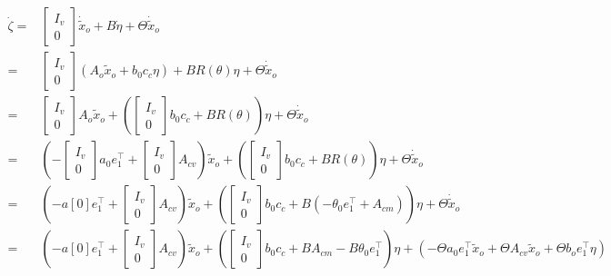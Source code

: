 \documentclass[a4paper,12pt]{article}
\begin{document}
\begin{align*}
    \dot{\zeta} 
       = & \begin{bmatrix}I_{v} \\ 0 \end{bmatrix} \dot{\tilde{x}}_o + B\dot{\eta} + \Theta \dot{\tilde{x}}_o
    \\ = & \begin{bmatrix}I_{v} \\ 0 \end{bmatrix}(A_o \tilde{x}_o + b_0 c_c \eta) + B R(\theta) \eta + \Theta \dot{\tilde{x}}_o
    \\ = & \begin{bmatrix}I_{v} \\ 0 \end{bmatrix}A_o \tilde{x}_o 
    + \left(\begin{bmatrix}I_{v} \\ 0 \end{bmatrix}b_0 c_c  + B R(\theta) \right)\eta 
    + \Theta \dot{\tilde{x}}_o
    \\ = & \left(-\begin{bmatrix}I_{v} \\ 0 \end{bmatrix}a_0e_1^\top + \begin{bmatrix}I_{v} \\ 0 \end{bmatrix}A_{cv} \right)\tilde{x}_o
    + \left(\begin{bmatrix}I_{v} \\ 0 \end{bmatrix}b_0 c_c  + B R(\theta) \right)\eta + \Theta \dot{\tilde{x}}_o
    \\ = & \left( -a[0]e_1^\top + \begin{bmatrix}I_{v} \\ 0 \end{bmatrix}A_{cv} \right)\tilde{x}_o
    + \left(\begin{bmatrix}I_{v} \\ 0 \end{bmatrix}b_0 c_c  
    + B \left(-\theta_0 e_1^\top + A_{cm}\right) \right)\eta 
    + \Theta \dot{\tilde{x}}_o
    \\ = & \left( -a[0]e_1^\top + \begin{bmatrix}I_{v} \\ 0 \end{bmatrix}A_{cv} \right)\tilde{x}_o
    + \left(\begin{bmatrix}I_{v} \\ 0 \end{bmatrix}b_0 c_c  
    + B A_{cm} -B\theta_0 e_1^\top \right)\eta 
    + \left( - \Theta a_0 e_1^\top\tilde{x}_o + \Theta A_{cv}\tilde{x}_o + \Theta b_oe_1^\top\eta\right)
\end{align*}
\end{document}
